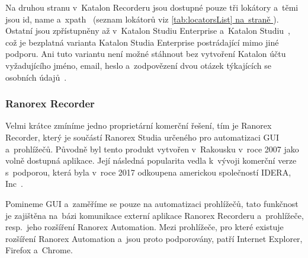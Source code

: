 \documentclass[12pt, a4paper, twoside]{article}
\newcommand{\crefAddedText}[3]{\hyperref[#1]{#2\cref{#1}#3}}
\begin{document}
	Na druhou stranu v~Katalon Recorderu jsou dostupné pouze tři lokátory a~těmi jsou id, name a~xpath~\cite{katalonRecorderVsStudio} (seznam lokátorů viz \crefAddedText{tab:locatorsList}{}{ na~straně \pageref{tab:locatorsList}}). Ostatní jsou zpřístupněny až v~Katalon Studiu Enterprise a~Katalon Studiu~\cite{katalonRecorderVsStudio}, což je bezplatná varianta Katalon Studia Enterprise postrádající mimo jiné podporu. Ani tuto variantu není možné stáhnout bez vytvoření Katalon účtu vyžadujícího jméno, email, heslo a~zodpovězení dvou otázek týkajících se osobních údajů~\cite{katalonPricing}.
	\newpage
    \subsubsection{Ranorex Recorder}
    Velmi krátce zmíníme jedno proprietární komerční řešení, tím je Ranorex Recorder, který je součástí Ranorex Studia určeného pro automatizaci GUI a~prohlížečů. Původně byl tento produkt vytvořen v~Rakousku v~roce 2007 jako volně dostupná aplikace. Její následná popularita vedla k~vývoji komerční verze s~podporou, která byla v~roce 2017 odkoupena americkou společností IDERA, Inc~\cite{ranorexAbout}.
    
    Pomineme GUI a~zaměříme se pouze na automatizaci prohlížečů, tato funkčnost je zajištěna na~bázi komunikace externí aplikace Ranorex Recorderu a~prohlížeče, resp.~jeho rozšíření Ranorex Automation. Mezi prohlížeče, pro které existuje rozšíření Ranorex Automation a~jsou proto podporovány, patří Internet Explorer, Firefox a~Chrome.
\end{document}
